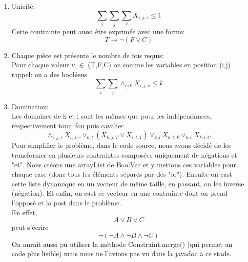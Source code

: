 \begin{enumerate}
    \item Unicité:
    \[ \sum_{i} \sum_{j} \sum_{v} X_{i,j,v}  \leq 1 \]
    Cette contrainte peut aussi être exprimée avec une forme: \[ T \longrightarrow \neg ( F \lor C ) \]
    
    \item Chaque pièce est présente le nombre de fois requis:\\
    Pour chaque valeur v $\in$ (T,F,C) on somme les variables en position (i,j) \\ rappel: on a des booléens
    \[\sum_{i} \sum_{j} \land_{v / k}   X_{i,j,v}  \leq k \]
    
    \item Domination:\\
    Les domaines de k et l sont les mêmes que pour les indépendances, respectivement tour, fou puis cavalier
    \[  \land_{i,j,v} X_{i,j,v} \lor_{k,l} ( X_{k,j,T} \lor X_{i,l,T} ) \lor_{k,l} X_{k,l,F} \lor_{k,l} X_{k,l,C} \]
    Pour simplifier le problème, dans le code source, nous avons décidé de les transformer en plusieurs contraintes composées uniquement de négations et "et". Nous créons une arrayList de BoolVar et y mettons ces variables pour chaque case (donc tous les éléments séparés par des "or"). Ensuite on cast cette liste dynamique en un vecteur de même taille, en passant, on les inverse (négation). Et enfin, on cast ce vecteur en une contrainte dont on prend l'opposé et la post dans le problème.\\
    En effet,
    \[  A \lor B \lor C \]
    peut s'écrire
    \[  \neg ( \neg A \land \neg B \land \neg C )\]
    On aurait aussi pu utiliser la méthode Constraint.merge() (qui permet un code plus lisible) mais nous ne l'avions pas vu dans la javadoc à ce stade.
    

\end{enumerate}
